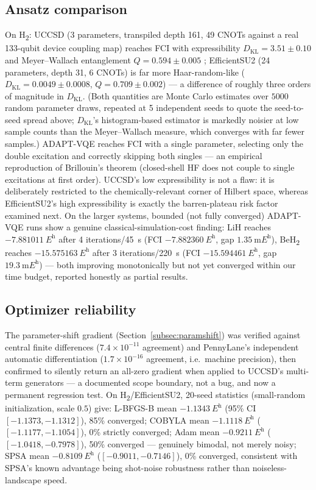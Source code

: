 \documentclass[11pt]{article}
\begin{document}
\subsection{Ansatz comparison}
On H\textsubscript{2}: UCCSD (3 parameters, transpiled depth 161, 49 CNOTs
against a real 133-qubit device coupling map) reaches FCI with expressibility
$D_{\mathrm{KL}}=3.51\pm0.10$ and Meyer--Wallach entanglement
$Q=0.594\pm0.005$ \cite{sim2019expressibility}; EfficientSU2 (24 parameters,
depth 31, 6 CNOTs) is far more Haar-random-like
($D_{\mathrm{KL}}=0.0049\pm0.0008$, $Q=0.709\pm0.002$) --- a difference of
roughly three orders of magnitude in $D_{\mathrm{KL}}$. (Both quantities are
Monte Carlo estimates over $5000$ random parameter draws, repeated at 5
independent seeds to quote the seed-to-seed spread above; $D_{\mathrm{KL}}$'s
histogram-based estimator is markedly noisier at low sample counts than the
Meyer--Wallach measure, which converges with far fewer samples.) ADAPT-VQE
\cite{grimsley2019adapt} reaches FCI with a single parameter, selecting only
the double excitation and correctly skipping both singles --- an empirical
reproduction of Brillouin's theorem (closed-shell HF does not couple to single
excitations at first order). UCCSD's low expressibility is not a flaw: it is
deliberately restricted to the chemically-relevant corner of Hilbert space,
whereas EfficientSU2's high expressibility is exactly the barren-plateau risk
factor examined next. On the larger systems, bounded (not fully converged)
ADAPT-VQE runs show a genuine classical-simulation-cost finding: LiH reaches
$\qty{-7.881011}{\hartree}$ after 4 iterations/\qty{45}{\second} (FCI
$\qty{-7.882360}{\hartree}$, gap $\qty{1.35}{\milli\hartree}$),
BeH\textsubscript{2} reaches $\qty{-15.575163}{\hartree}$ after 3
iterations/\qty{220}{\second} (FCI $\qty{-15.594461}{\hartree}$, gap
$\qty{19.3}{\milli\hartree}$) --- both improving monotonically but not yet
converged within our time budget, reported honestly as partial results.

\subsection{Optimizer reliability}
The parameter-shift gradient (Section~\ref{subsec:paramshift}) was verified
against central finite differences ($7.4\times10^{-11}$ agreement) and
PennyLane's independent automatic differentiation ($1.7\times10^{-16}$
agreement, i.e.\ machine precision), then confirmed to silently return an
all-zero gradient when applied to UCCSD's multi-term generators --- a
documented scope boundary, not a bug, and now a permanent regression test. On
H\textsubscript{2}/EfficientSU2, 20-seed statistics (small-random
initialization, scale $0.5$) give: L-BFGS-B mean $\qty{-1.1343}{\hartree}$
(95\% CI $[-1.1373,-1.1312]$), 85\% converged; COBYLA mean
$\qty{-1.1118}{\hartree}$ ($[-1.1177,-1.1054]$), 0\% strictly converged; Adam
mean $\qty{-0.9211}{\hartree}$ ($[-1.0418,-0.7978]$), 50\% converged ---
genuinely bimodal, not merely noisy; SPSA mean $\qty{-0.8109}{\hartree}$
($[-0.9011,-0.7146]$), 0\% converged, consistent with SPSA's known advantage
being shot-noise robustness rather than noiseless-landscape speed.
\end{document}
